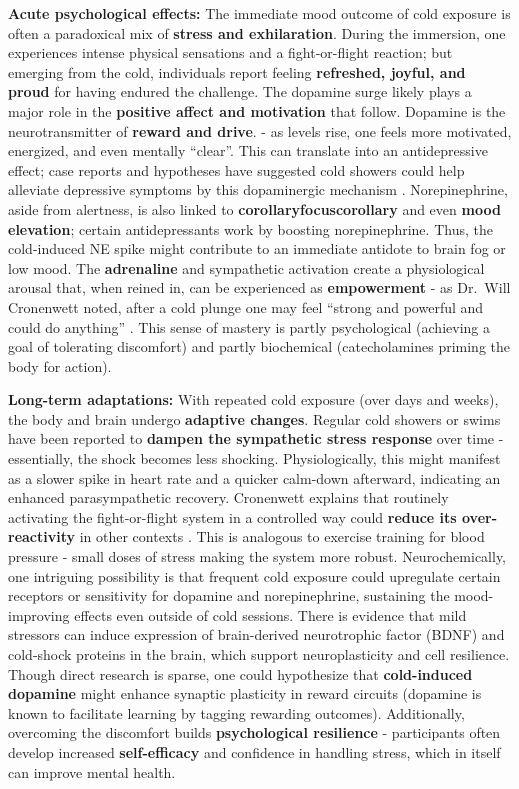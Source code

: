 \documentclass[11pt]{article}
\newcommand{\quotes}[1]{``#1''}
\begin{document}
\textbf{Acute psychological effects:} The immediate mood outcome of cold exposure is often a paradoxical mix of \textbf{stress and exhilaration}. During the immersion, one experiences intense physical sensations and a fight-or-flight reaction; but emerging from the cold, individuals report feeling \textbf{refreshed, joyful, and proud} for having endured the challenge. The dopamine surge likely plays a major role in the \textbf{positive affect and motivation} that follow. Dopamine is the neurotransmitter of \textbf{reward and drive}. - as levels rise, one feels more motivated, energized, and even mentally \quotes{clear}. This can translate into an antidepressive effect; case reports and hypotheses have suggested cold showers could help alleviate depressive symptoms by this dopaminergic mechanism \cite{januaryJanuary}. Norepinephrine, aside from alertness, is also linked to \textbf{corollaryfocuscorollary} and even \textbf{mood elevation}; certain antidepressants work by boosting norepinephrine. Thus, the cold-induced NE spike might contribute to an immediate antidote to brain fog or low mood. The \textbf{adrenaline} and sympathetic activation create a physiological arousal that, when reined in, can be experienced as \textbf{empowerment} - as Dr.\ Will Cronenwett noted, after a cold plunge one may feel \quotes{strong and powerful and could do anything} \cite{pbsBathsSocial}. This sense of mastery is partly psychological (achieving a goal of tolerating discomfort) and partly biochemical (catecholamines priming the body for action).

\textbf{Long-term adaptations:} With repeated cold exposure (over days and weeks), the body and brain undergo \textbf{adaptive changes}. Regular cold showers or swims have been reported to \textbf{dampen the sympathetic stress response} over time - essentially, the shock becomes less shocking. Physiologically, this might manifest as a slower spike in heart rate and a quicker calm-down afterward, indicating an enhanced parasympathetic recovery. Cronenwett explains that routinely activating the fight-or-flight system in a controlled way could \textbf{reduce its over-reactivity} in other contexts \cite{pbsBathsSocial}. This is analogous to exercise training for blood pressure - small doses of stress making the system more robust. Neurochemically, one intriguing possibility is that frequent cold exposure could upregulate certain receptors or sensitivity for dopamine and norepinephrine, sustaining the mood-improving effects even outside of cold sessions. There is evidence that mild stressors can induce expression of brain-derived neurotrophic factor (BDNF) and cold-shock proteins in the brain, which support neuroplasticity and cell resilience. Though direct research is sparse, one could hypothesize that \textbf{cold-induced dopamine} might enhance synaptic plasticity in reward circuits (dopamine is known to facilitate learning by tagging rewarding outcomes). Additionally, overcoming the discomfort builds \textbf{psychological resilience} - participants often develop increased \textbf{self-efficacy} and confidence in handling stress, which in itself can improve mental health.
\end{document}
